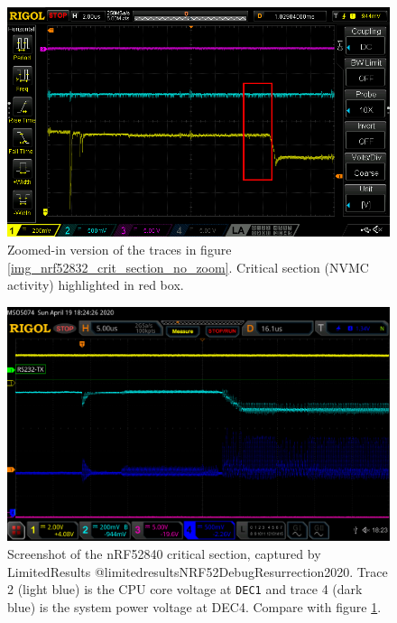\begin{figure}
\centering
\includegraphics[width=5.72917in,height=\textheight]{res/nrf52832_crit_section_zoom_highlight.png}
\caption{Zoomed-in version of the traces in figure
\ref{img_nrf52832_crit_section_no_zoom}. Critical section (NVMC
activity) highlighted in red box.\label{img_nrf52832_crit_section_zoom}}
\end{figure}

\begin{figure}
\centering
\includegraphics[width=5.72917in,height=\textheight]{res/nrf52832_limitedresults_crit_section.png}
\caption{Screenshot of the nRF52840 critical section, captured by
LimitedResults @limitedresultsNRF52DebugResurrection2020. Trace 2 (light
blue) is the CPU core voltage at \texttt{DEC1} and trace 4 (dark blue)
is the system power voltage at DEC4. Compare with figure
\ref{img_nrf52832_crit_section_zoom}.\label{img_nrf52832_limitedresults_crit_section}}
\end{figure}

